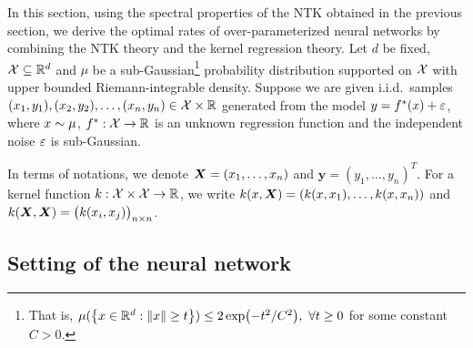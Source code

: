 In this section, using the spectral properties of the NTK obtained in the previous section,
we derive the optimal rates of over-parameterized neural networks by combining the NTK theory and the kernel regression theory.
Let $d$ be fixed, $\mathcal{X} \subseteq \mathbb{R}^d$ and $\mu$ be a sub-Gaussian\footnote{
That is, $\mu(\left\{ x \in \mathbb{R}^d : \norm{x} \geq t \right\}) \leq 2 \exp(-t^2 / C^2),~ \forall t \geq 0$ for some constant $C > 0$.
}
probability distribution supported on $\mathcal{X}$ with upper bounded Riemann-integrable density.
Suppose we are given i.i.d.\ samples $(x_1,y_1),(x_2,y_2),\dots,(x_n,y_n) \in \mathcal{X} \times \mathbb{R}$ generated from the model
$y = f^*(x) + \varepsilon$,
where $x \sim \mu$, $f^* : \mathcal{X} \to \mathbb{R}$ is an unknown regression function and the independent noise $\varepsilon$ is sub-Gaussian.

In terms of notations, we denote $\bm{X} = (x_1,\dots,x_n)$ and $\bm{y} = (y_1,\dots,y_n)^T$.
For a kernel function $k : \mathcal{X}\times\mathcal{X} \to \mathbb{R}$, we write $k(x,\bm{X}) = (k(x,x_1),\dots,k(x,x_n))$
and $k(\bm{X},\bm{X}) = \big(k(x_i,x_j)\big)_{n\times n}$.

\subsection{Setting of the neural network}
\label{subsec:NN_Setting}

